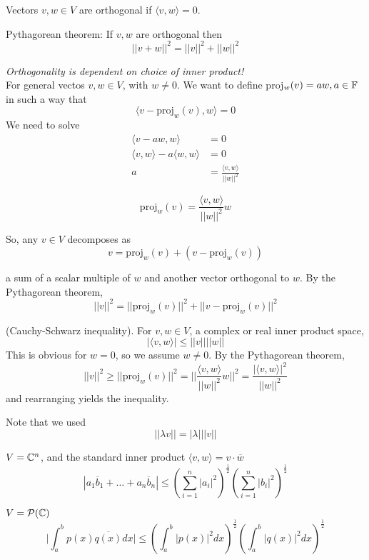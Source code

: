 \documentclass[12pt]{article}
\begin{document}
\begin{defn}
	Vectors $v,w\in V$ are orthogonal if $\langle v,w \rangle = 0$.
\end{defn}

Pythagorean theorem: If $v,w$ are orthogonal then
$$||v+w||^2 = ||v||^2 + ||w||^2$$

\emph{Orthogonality is dependent on choice of inner product!} \\
For general vectos $v,w\in V$, with $w \neq 0$. We want to define proj$_w(v) = aw, a \in \mathbb{F}$ in such a way that
$$\langle v-\text{proj}_w(v),w \rangle = 0$$
We need to solve
\begin{align*}
	\langle v-aw, w \rangle &= 0 \\
	\langle v,w \rangle - a\langle w,w \rangle &= 0 \\
	a &= \frac{\langle v,w \rangle}{||w||^2}
\end{align*}

\begin{defn}
	$$\text{proj}_w(v) = \frac{\langle v,w \rangle}{||w||^2}w$$
\end{defn}

So, any $v \in V$ decomposes as
$$v = \text{proj}_w(v) + \left(v-\text{proj}_w(v)\right)$$

a sum of a scalar multiple of $w$ and another vector orthogonal to $w$. By the Pythagorean theorem,
$$||v||^2 = ||\text{proj}_w(v)||^2 + ||v-\text{proj}_w(v)||^2$$

\begin{thm}
	(Cauchy-Schwarz inequality). For $v,w \in V$, a complex or real inner product space,
	$$|\langle v,w \rangle| \leq ||v|| ||w||$$
	This is obvious for $w=0$, so we assume $w \neq 0$. By the Pythagorean theorem,
	$$||v||^2 \geq ||\text{proj}_w(v)||^2 = \Big | \Big | \frac{\langle v,w \rangle}{||w||^2}w \Big | \Big |^2 = \frac{|\langle v,w \rangle|^2}{||w||^2}$$
	and rearranging yields the inequality.
\end{thm}

Note that we used
$$||\lambda v|| = |\lambda| ||v||$$

\begin{ex}
	$V=\mathbb{C}^n$, and the standard inner product $\langle v,w \rangle = v\cdot\overline{w}$
	$$|a_1\overline{b}_1+\dots+a_n\overline{b}_n| \leq \left(\sum_{i=1}^n |a_i|^2\right)^{\frac{1}{2}}\left(\sum_{i=1}^n |b_i|^2\right)^{\frac{1}{2}}$$
\end{ex}

\begin{ex}
	$V=\mathcal{P}(\mathbb{C})$
	$$\Big | \int_a^b p(x)\overline{q(x)}dx \Big | \leq \left(\int_a^b |p(x)|^2dx\right)^{\frac{1}{2}}\left(\int_a^b |q(x)|^2dx\right)^{\frac{1}{2}}$$
\end{ex}
\end{document}
